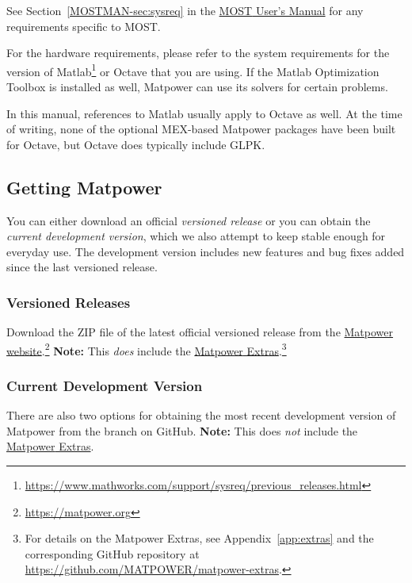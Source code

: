 \documentclass[12pt]{article}
\newcommand{\matlab}[0]{{\sc Matlab}}
\newcommand{\matpower}[0]{{\sc Matpower}}
\newcommand{\matpowerurl}[0]{https://matpower.org}
\newcommand{\matpowerextrasgithuburl}[0]{https://github.com/MATPOWER/matpower-extras}
\newcommand{\matpowerextraslink}[0]{\href{\matpowerextrasgithuburl}{\matpower{} Extras}}
\newcommand{\most}[0]{{MOST}}
\newcommand{\mostver}[0]{1.3.1}
\newcommand{\glpk}[0]{{GLPK}}
\newcommand{\ot}[0]{{Optimization Toolbox}}
\newcommand{\code}[1]{{\relsize{-0.5}{\tt{{#1}}}}}  %
\newcommand{\mostmanurl}[0]{https://matpower.org/docs/MOST-manual-\mostver.pdf}
\newcommand{\mostman}[0]{\href{\mostmanurl}{\most{} User's Manual}}
\numberwithin{equation}{section}
\numberwithin{table}{section}
\numberwithin{figure}{section}
\begin{document}
See Section~\ref{MOSTMAN-sec:sysreq} in the \mostman{} for any requirements specific to \most{}.

For the hardware requirements, please refer to the system requirements for the version of \matlab{}\footnote{\url{https://www.mathworks.com/support/sysreq/previous_releases.html}} or Octave that you are using. If the \matlab{} \ot{} is installed as well, \matpower{} can use its solvers for certain problems.

In this manual, references to \matlab{} usually apply to Octave as well. At the time of writing, none of the optional MEX-based \matpower{} packages have been built for Octave, but Octave does typically include \glpk{}.

\pagebreak
\subsection{Getting \matpower{}}
\label{sec:gettingmatpower}

You can either download an official \emph{versioned release} or you can obtain the \emph{current development version}, which we also attempt to keep stable enough for everyday use. The development version includes new features and bug fixes added since the last versioned release.

\subsubsection{Versioned Releases}

Download the ZIP file of the latest official versioned release from the \href{\matpowerurl}{\matpower{} website}.\footnote{\url{\matpowerurl}}
{\bf Note:} This \emph{does} include the \matpowerextraslink{}.\footnote{For details on the \matpower{} Extras, see Appendix~\ref{app:extras} and the corresponding GitHub repository at \url{\matpowerextrasgithuburl}.}

\subsubsection{Current Development Version}

There are also two options for obtaining the most recent development version
of \matpower{} from the \code{master} branch on GitHub.
{\bf Note:} This does \emph{not} include the \matpowerextraslink{}.
\end{document}
